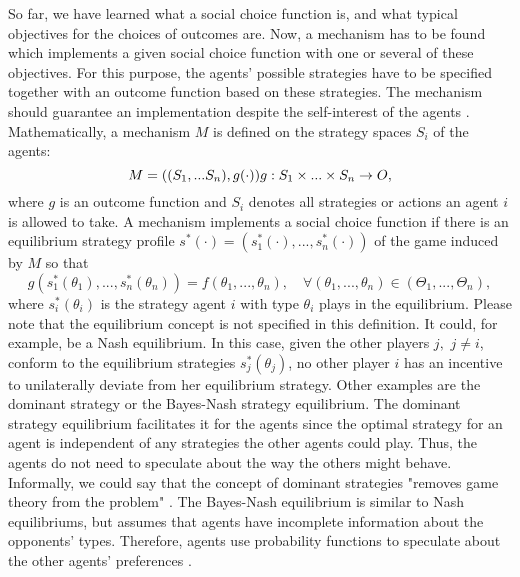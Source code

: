 So far, we have learned what a social choice function is, and what
typical objectives for the choices of outcomes are. Now, a
mechanism has to be found which implements a given social choice
function with one or several of these objectives. For this
purpose, the agents' possible strategies have to be specified
together with an outcome function based on these strategies. The
mechanism should guarantee an implementation despite the
self-interest of the agents \parencite{Bastian.2011}. Mathematically, a
mechanism $M$ is defined on the strategy spaces $S_i$ of the
agents:
\begin{equation}\label{MechanismDefinition}
  M=((S_1,...S_n),g(\cdot))\\
  g:S_1\times...\times S_n\rightarrow O,
\end{equation}
where $g$ is an outcome function and $S_i$ denotes all strategies
or actions an agent $i$ is allowed to take. A mechanism implements
a social choice function if there is an equilibrium strategy
profile $s^\ast(\cdot)=(s^\ast_1(\cdot),...,s^\ast_n(\cdot))$ of
the game induced by $M$ so that
\begin{equation}\label{MechanismImplements}
    g(s^\ast_1(\theta_1),...,s^\ast_n(\theta_n))=f(\theta_1,...,\theta_n),
      \quad \forall
      (\theta_1,...,\theta_n)\in(\Theta_1,...,\Theta_n),
\end{equation}
where $s^\ast_i(\theta_i)$ is the strategy agent $i$ with type
$\theta_i$ plays in the equilibrium. Please note that the
equilibrium concept is not specified in this definition. It could,
for example, be a Nash equilibrium. In this case, given the other
players $j,$ $j \neq i$, conform to the equilibrium strategies
$s^\ast_j(\theta_j)$, no other player $i$ has an incentive to
unilaterally deviate from her equilibrium strategy. Other examples
are the dominant strategy or the Bayes-Nash strategy equilibrium.
The dominant strategy equilibrium facilitates it for the agents
since the optimal strategy for an agent is independent of any
strategies the other agents could play. Thus, the agents do not
need to speculate about the way the others might behave. Informally,
we could say that the concept of dominant strategies "removes game
theory from the problem" \textcite[p.~5]{Bastian.2011}. The Bayes-Nash
equilibrium is similar to Nash equilibriums, but assumes that
agents have incomplete information about the opponents' types.
Therefore, agents use probability functions to speculate about the
other agents' preferences \parencite{Epley.2007}.

